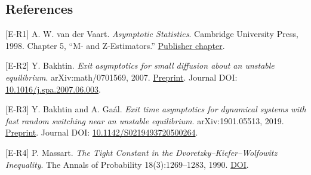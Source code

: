 \subsection{References}\label{scalar_exit-references}

{[}E-R1{]} A. W. van der Vaart. \emph{Asymptotic Statistics}. Cambridge
University Press, 1998. Chapter 5, ``M- and Z-Estimators.''
\href{https://doi.org/10.1017/CBO9780511802256.006}{Publisher chapter}.

{[}E-R2{]} Y. Bakhtin. \emph{Exit asymptotics for small diffusion about
an unstable equilibrium}. arXiv:math/0701569, 2007.
\href{https://arxiv.org/abs/math/0701569}{Preprint}. Journal DOI:
\href{https://doi.org/10.1016/j.spa.2007.06.003}{10.1016/j.spa.2007.06.003}.

{[}E-R3{]} Y. Bakhtin and A. Gaál. \emph{Exit time asymptotics for
dynamical systems with fast random switching near an unstable
equilibrium}. arXiv:1901.05513, 2019.
\href{https://arxiv.org/abs/1901.05513}{Preprint}. Journal DOI:
\href{https://doi.org/10.1142/S0219493720500264}{10.1142/S0219493720500264}.

{[}E-R4{]} P. Massart. \emph{The Tight Constant in the
Dvoretzky--Kiefer--Wolfowitz Inequality}. The Annals of Probability
18(3):1269--1283, 1990.
\href{https://doi.org/10.1214/aop/1176990746}{DOI}.
